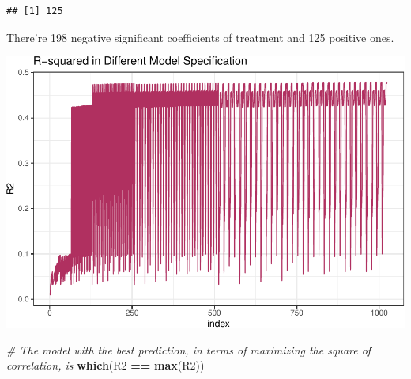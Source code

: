 \documentclass[]{article}
\newenvironment{Shaded}{\begin{snugshade}}{\end{snugshade}}
\newcommand{\KeywordTok}[1]{\textcolor[rgb]{0.13,0.29,0.53}{\textbf{#1}}}
\newcommand{\DataTypeTok}[1]{\textcolor[rgb]{0.13,0.29,0.53}{#1}}
\newcommand{\DecValTok}[1]{\textcolor[rgb]{0.00,0.00,0.81}{#1}}
\newcommand{\StringTok}[1]{\textcolor[rgb]{0.31,0.60,0.02}{#1}}
\newcommand{\CommentTok}[1]{\textcolor[rgb]{0.56,0.35,0.01}{\textit{#1}}}
\newcommand{\OperatorTok}[1]{\textcolor[rgb]{0.81,0.36,0.00}{\textbf{#1}}}
\newcommand{\NormalTok}[1]{#1}
\begin{document}
\begin{verbatim}
## [1] 125
\end{verbatim}

There're 198 negative significant coefficients of treatment and 125
positive ones.

\begin{Shaded}
\end{Shaded}

\includegraphics{hw1_files/figure-latex/unnamed-chunk-3-1.pdf}

\begin{Shaded}
\begin{Highlighting}[]
\CommentTok{# The model with the best prediction, in terms of maximizing the square of correlation, is}
\KeywordTok{which}\NormalTok{(R2 }\OperatorTok{==}\StringTok{ }\KeywordTok{max}\NormalTok{(R2))}
\end{Highlighting}
\end{Shaded}
\end{document}

